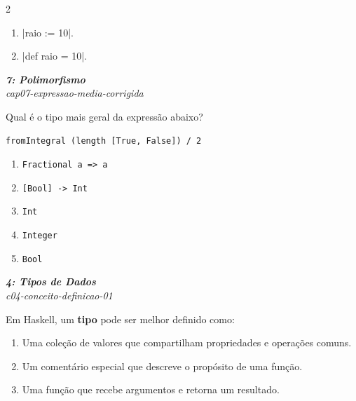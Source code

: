 \documentclass[a4paper,10pt,brazil]{article}
\begin{document}
\begin{multicols}{2}
\begin{enumerate}
  \item \haskellinline|raio := 10|.

  \item \haskellinline|def raio = 10|.


\end{enumerate}

\begin{flushright}
  \footnotesize
  \textit{\textbf{7: Polimorfismo}}\\
  \textit{cap07-expressao-media-corrigida}\\

\end{flushright}
Qual é o tipo mais geral da expressão abaixo?

\begin{verbatim}
fromIntegral (length [True, False]) / 2
\end{verbatim}

\begin{enumerate}
  \item \texttt{Fractional a => a}
  \item \texttt{[Bool] -> Int}
  \item \texttt{Int}
  \item \texttt{Integer}
  \item \texttt{Bool}

\end{enumerate}

\begin{flushright}
  \footnotesize
  \textit{\textbf{4: Tipos de Dados}}\\
  \textit{c04-conceito-definicao-01}\\

\end{flushright}
Em Haskell, um \textbf{tipo} pode ser melhor definido como:

\begin{enumerate}
  \item Uma coleção de valores que compartilham propriedades e operações comuns.

  \item Um comentário especial que descreve o propósito de uma função.

  \item Uma função que recebe argumentos e retorna um resultado.


\end{enumerate}
\end{multicols}
\end{document}
